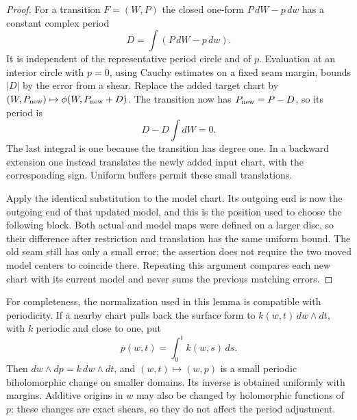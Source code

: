 \begin{proof}
For a transition $F=(W,P)$ the closed one-form
$P\,dW-p\,dw$ has a constant complex period
\[
                     D=\int(P\,dW-p\,dw).
\]
It is independent of the representative period circle and of $p$.
Evaluation at an interior circle with $p=0$, using Cauchy estimates
on a fixed seam margin, bounds $|D|$ by the error from a shear.
Replace the added target chart by
$(W,P_{\rm new})\mapsto\phi(W,P_{\rm new}+D)$.  The transition
now has $P_{\rm new}=P-D$, so its period is
\[
        D-D\int dW=0.
\]
The last integral is one because the transition has degree one.
In a backward extension one instead translates the newly added
input chart, with the corresponding sign.  Uniform buffers permit
these small translations.

Apply the identical substitution to the model chart.  Its outgoing
end is now the outgoing end of that updated model, and this is the
position used to choose the following block.  Both actual and
model maps were defined on a larger disc, so their difference after
restriction and translation has the same uniform bound.  The old
seam still has only a small error; the assertion does not require
the two moved model centers to coincide there.  Repeating this
argument compares each new chart with its current model and never
sums the previous matching errors.
\end{proof}

For completeness, the normalization used in this lemma is compatible
with periodicity.  If a nearby chart pulls back the surface form to
$k(w,t)\,dw\wedge dt$, with $k$ periodic and close to one, put
\[
                       p(w,t)=\int_0^t k(w,s)\,ds.
\]
Then $dw\wedge dp=k\,dw\wedge dt$, and $(w,t)\mapsto(w,p)$ is a
small periodic biholomorphic change on smaller domains.  Its inverse
is obtained uniformly with margins.  Additive origins in $w$ may
also be changed by holomorphic functions of $p$; these changes are
exact shears, so they do not affect the period adjustment.
